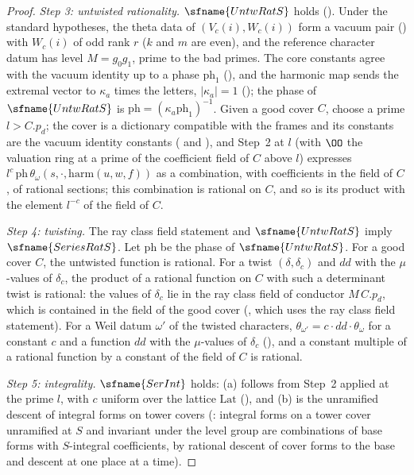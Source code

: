 \begin{proof}
\emph{Step 3: untwisted rationality.} $\sfname{UntwRatS}$ holds ().
Under the standard hypotheses, the theta data of $(V_c(i),W_c(i))$ form a vacuum pair ()
with $W_c(i)$ of odd rank $r$ ($k$ and $m$ are even), and the reference character datum has level $M=g_0g_1$, prime to the bad
primes. The core constants agree with the vacuum identity up to a phase $\mathrm{ph}_1$
(), and the harmonic map sends the extremal vector to
$\kappa_a$ times the letters, $|\kappa_a|=1$ (); the phase of
$\sfname{UntwRatS}$ is $\mathrm{ph}=(\kappa_a\mathrm{ph}_1)^{-1}$. Given a good cover $C$, choose a prime $l>C.p_d$; the cover is a
dictionary compatible with the frames and its constants are the vacuum identity constants
( and ),
and Step~2 at $l$ (with $\OO$ the valuation ring at a prime of the coefficient field of $C$ above $l$) expresses
$l^c\,\mathrm{ph}\,\theta_\omega(s,\cdot,\mathrm{harm}(u,w,f))$ as a combination, with coefficients in the field of $C$, of rational
sections; this combination is rational on $C$, and so is its product with the element $l^{-c}$ of the field of $C$.

\emph{Step 4: twisting.} The ray class field statement and $\sfname{UntwRatS}$ imply $\sfname{SeriesRatS}$. Let $\mathrm{ph}$ be the
phase of $\sfname{UntwRatS}$. For a good cover $C$, the untwisted function is rational. For a twist $(\delta,\delta_c)$ and $dd$ with
the $\mu$-values of $\delta_c$, the product of a rational function on $C$ with such a determinant twist is rational: the values of
$\delta_c$ lie in the ray class field of conductor $M\,C.p_d$, which is contained in the field of the good cover
(, which uses the ray class field statement). For a Weil datum
$\omega'$ of the twisted characters, $\theta_{\omega'}=c\cdot dd\cdot\theta_\omega$ for a constant $c$ and a function $dd$ with the
$\mu$-values of $\delta_c$ (), and a constant multiple of a rational function
by a constant of the field of $C$ is rational.

\emph{Step 5: integrality.} $\sfname{SerInt}$ holds: (a) follows from Step~2 applied at the prime $l$, with $c$ uniform over the
lattice $\mathrm{Lat}$ (), and (b) is the unramified descent of integral forms on
tower covers (: integral forms on a tower cover unramified at
$S$ and invariant under the level group are combinations of base forms with $S$-integral coefficients, by rational descent of cover
forms to the base and descent at one place at a time).
\end{proof}

